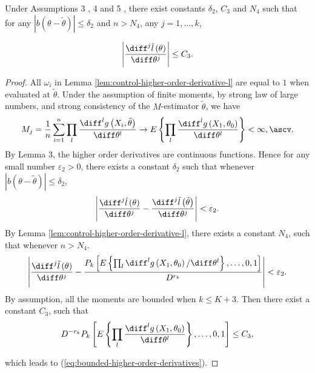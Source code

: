 \begin{lemma}
\label{lem:bounded-high-order-der} Under Assumptions 3 , 4 and 5 ,
there exist constants $\delta_{2}$, $C_{3}$ and $N_{4}$ such that
for any $\left|b\left(\theta-\tilde{\theta}\right)\right|\le\delta_{2}$
and $n>N_{4}$, any $j=1,\ldots,k$,%
\begin{comment}
need add consistency conditions for M-Estimator
\end{comment}
{} 
\begin{equation}
\left|\frac{\diff^{j}\tilde{l}\left(\theta\right)}{\diff\theta^{j}}\right|\le C_{3}.\label{eq:bounded-higher-order-derivatives}
\end{equation}
\end{lemma}
\begin{proof}
All $\omega_{i}$ in Lemma \ref{lem:control-higher-order-derivative-l}
are equal to $1$ when evaluated at $\tilde{\theta}$. Under the assumption
of finite moments, by strong law of large numbers, and strong consistency
of the $M$-estimator $\tilde{\theta}$, we have 
\[
M_{j}=\frac{1}{n}\sum_{i=1}^{n}\prod_{l}\frac{\diff^{l}g\left(X_{i},\tilde{\theta}\right)}{\diff\theta^{l}}\rightarrow E\left\{ \prod_{l}\frac{\diff^{l}g\left(X_{1},\theta_{0}\right)}{\diff\theta^{l}}\right\} <\infty,\ascv.
\]
 By Lemma 3, the higher order
derivatives are continuous functions. Hence for any small number $\varepsilon_{2}>0$,
there exists a constant $\delta_{2}$ such that whenever $\left|b\left(\theta-\tilde{\theta}\right)\right|\le\delta_{2}$,
\[
\left|\frac{\diff^{j}\tilde{l}\left(\theta\right)}{\diff\theta^{j}}-\frac{\diff^{j}\tilde{l}\left(\tilde{\theta}\right)}{\diff\theta^{j}}\right|<\varepsilon_{2}.
\]
By Lemma \ref{lem:control-higher-order-derivative-l}, there exists
a constant $N_{4}$, such that whenever $n>N_{4}$. 
\[
\left|\frac{\diff^{j}\tilde{l}\left(\theta\right)}{\diff\theta^{j}}-\frac{P_{k}\left[E\left\{ \prod_{l}\diff^{l}g\left(X_{1},\theta_{0}\right)/\diff\theta^{l}\right\} ,\ldots,0,1\right]}{D^{r_{k}}}\right|<\varepsilon_{2}.
\]
By assumption, all the moments are bounded when $k\le K+3$.
Then there exist a constant $C_{3}$, such that 
\[
D^{-r_{k}}P_{k}\left[E\left\{ \prod_{l}\frac{\diff^{l}g\left(X_{1},\theta_{0}\right)}{\diff\theta^{l}}\right\} ,\ldots,0,1\right]\le C_{3},
\]
\begin{comment}
change the length
\end{comment}
 which leads to (\ref{eq:bounded-higher-order-derivatives}). 
\end{proof}

